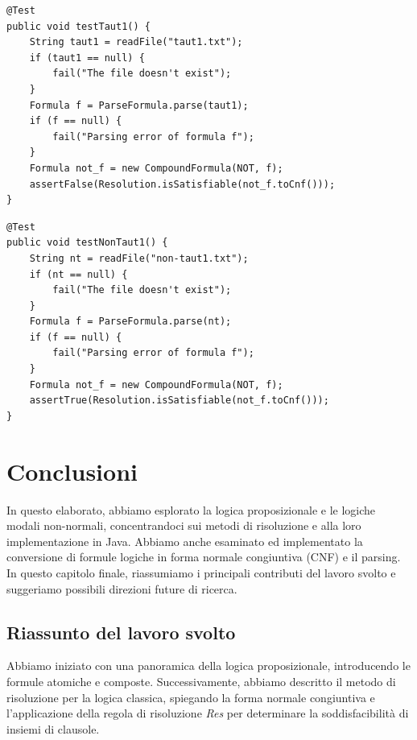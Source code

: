 \documentclass[a4paper,12pt]{report}
\begin{document}
\begin{minipage}{\linewidth}
    \begin{lstlisting}[caption={Metodo che testa la validità della formula nel file \emph{taut1.txt}}, label={method:testTaut1}]
@Test
public void testTaut1() {
    String taut1 = readFile("taut1.txt");
    if (taut1 == null) {
        fail("The file doesn't exist");
    }
    Formula f = ParseFormula.parse(taut1);
    if (f == null) {
        fail("Parsing error of formula f");
    }
    Formula not_f = new CompoundFormula(NOT, f);
    assertFalse(Resolution.isSatisfiable(not_f.toCnf()));
}
    \end{lstlisting}
\end{minipage}

\vspace{20pt}

\begin{minipage}{\linewidth}
    \begin{lstlisting}[caption={Metodo che testa la non validità della formula nel file \emph{non-taut1.txt}}, label={method:testNonTaut1}]
@Test
public void testNonTaut1() {
    String nt = readFile("non-taut1.txt");
    if (nt == null) {
        fail("The file doesn't exist");
    }
    Formula f = ParseFormula.parse(nt);
    if (f == null) {
        fail("Parsing error of formula f");
    }
    Formula not_f = new CompoundFormula(NOT, f);
    assertTrue(Resolution.isSatisfiable(not_f.toCnf()));
}
    \end{lstlisting}
\end{minipage}

% 
% 
\chapter{Conclusioni}
\label{conclusion}
In questo elaborato, abbiamo esplorato la logica proposizionale e le logiche modali non-normali, concentrandoci sui metodi di risoluzione e alla loro implementazione in Java. Abbiamo anche esaminato ed implementato la conversione di formule logiche in forma normale congiuntiva (CNF) e il parsing. In questo capitolo finale, riassumiamo i principali contributi del lavoro svolto e suggeriamo possibili direzioni future di ricerca.

\section{Riassunto del lavoro svolto}

Abbiamo iniziato con una panoramica della logica proposizionale, introducendo le formule atomiche e composte. Successivamente, abbiamo descritto il metodo di risoluzione per la logica classica, spiegando la forma normale congiuntiva e l'applicazione della regola di risoluzione \emph{Res} per determinare la soddisfacibilità di insiemi di clausole.
\end{document}
